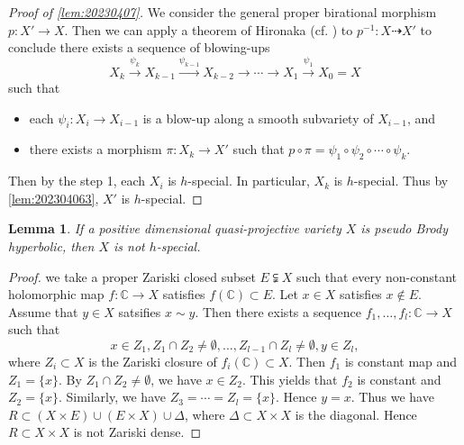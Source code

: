 \documentclass[11pt,english]{smfart}
\theoremstyle{plain}
\newtheorem{lem}[thm]{Lemma}
\theoremstyle{definition}
\theoremstyle{remark}
\numberwithin{equation}{subsection}
\theoremstyle{plain}
\begin{document}
\begin{proof}[Proof of \cref{lem:20230407}]
\medskip

We consider the general proper birational morphism $p:X'\to X$.  
 Then we can apply a theorem of Hironaka 
 (cf. \cite[Corollary 3.18]{Kol07}) 
to $p^{-1}:X\dashrightarrow X'$ to conclude 
there exists a sequence of blowing-ups
$$
X_k\overset{\psi_k}{\longrightarrow}X_{k-1}\overset{\psi_{k-1}}{\longrightarrow}X_{k-2}\longrightarrow\cdots\longrightarrow X_1\overset{\psi_1}{\longrightarrow}X_0=X$$
such that
\begin{itemize}
\item
each $\psi_i:X_{i}\to X_{i-1}$ is a blow-up along a smooth subvariety of $X_{i-1}$, and
\item
there exists a morphism $\pi:X_k\to X'$ such that $p\circ\pi=\psi_1\circ\psi_2\circ\cdots\circ\psi_k$.
\end{itemize}
Then by the step 1, each $X_i$ is $h$-special.
In particular, $X_k$ is $h$-special.
Thus by \cref{lem:202304063}, $X'$ is $h$-special.
\end{proof} 	





\begin{lem}\label{lem:202304065}
If a positive dimensional quasi-projective variety $X$ is pseudo Brody hyperbolic, then $X$ is not $h$-special.
\end{lem} 
 \begin{proof}
  we take a proper Zariski closed subset $E\subsetneqq X$ such that every non-constant holomorphic map $f:\mathbb C\to X$ satisfies $f(\mathbb C)\subset E$.
Let $x\in X$ satisfies $x\not\in E$.
Assume that $y\in X$ satsifies $x\sim y$.
Then there exists a sequence $f_1,\ldots,f_l:\mathbb C\to X$ such that 
$$x\in Z_1, Z_1\cap Z_2\not=\emptyset,\ldots,Z_{l-1}\cap Z_l\not=\emptyset, y\in Z_l,$$
where $Z_i\subset X$ is the Zariski closure of $f_i(\mathbb C)\subset X$.
Then $f_1$ is constant map and $Z_1=\{x\}$.
By $Z_1\cap Z_2\not=\emptyset$, we have $x\in Z_2$.
This yields that $f_2$ is constant and $Z_2=\{x\}$.
Similarly, we have $Z_3=\cdots=Z_l=\{ x\}$.
Hence $y=x$.
Thus we have $R\subset (X\times E)\cup (E\times X)\cup \Delta$, where $\Delta\subset X\times X$ is the diagonal.
Hence $R\subset X\times X$ is not Zariski dense. 
\end{proof}
\end{document}
